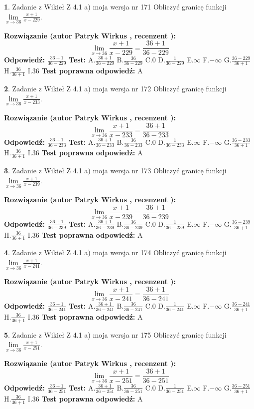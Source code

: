 \documentclass[12pt, a4paper]{article}
\theoremstyle{definition} %
\newtheorem{zad}{}
\newcommand{\zadStart}[1]{\begin{zad}#1\newline}
\newcommand{\zadStop}{\end{zad}}
\newcommand{\rozwStart}[2]{\noindent \textbf{Rozwiązanie (autor #1 , recenzent #2): }\newline}
\newcommand{\rozwStop}{\newline}
\newcommand{\odpStart}{\noindent \textbf{Odpowiedź:}\newline}
\newcommand{\odpStop}{\newline}
\newcommand{\testStart}{\noindent \textbf{Test:}\newline}
\newcommand{\testStop}{\newline}
\newcommand{\kluczStart}{\noindent \textbf{Test poprawna odpowiedź:}\newline}
\newcommand{\kluczStop}{\newline}
\begin{document}
\zadStart{Zadanie z Wikieł Z 4.1 a) moja wersja nr 171}
Obliczyć granicę funkcji $\lim\limits_{x\to36}\frac{x+1}{x-229}$.
\zadStop
\rozwStart{Patryk Wirkus}{}
$$\lim\limits_{x\to36}\frac{x+1}{x-229} = \frac{36+1}{36-229}$$
\rozwStop
\odpStart
$\frac{36+1}{36-229}$
\odpStop
\testStart
A.$\frac{36+1}{36-229}$
B.$\frac{36}{36-229}$
C.$0$
D.$\frac{1}{36-229}$
E.$\infty$
F.$-\infty$
G.$\frac{36-229}{36+1}$
H.$\frac{36}{36+1}$
I.$36$
\testStop
\kluczStart
A
\kluczStop



\zadStart{Zadanie z Wikieł Z 4.1 a) moja wersja nr 172}
Obliczyć granicę funkcji $\lim\limits_{x\to36}\frac{x+1}{x-233}$.
\zadStop
\rozwStart{Patryk Wirkus}{}
$$\lim\limits_{x\to36}\frac{x+1}{x-233} = \frac{36+1}{36-233}$$
\rozwStop
\odpStart
$\frac{36+1}{36-233}$
\odpStop
\testStart
A.$\frac{36+1}{36-233}$
B.$\frac{36}{36-233}$
C.$0$
D.$\frac{1}{36-233}$
E.$\infty$
F.$-\infty$
G.$\frac{36-233}{36+1}$
H.$\frac{36}{36+1}$
I.$36$
\testStop
\kluczStart
A
\kluczStop



\zadStart{Zadanie z Wikieł Z 4.1 a) moja wersja nr 173}
Obliczyć granicę funkcji $\lim\limits_{x\to36}\frac{x+1}{x-239}$.
\zadStop
\rozwStart{Patryk Wirkus}{}
$$\lim\limits_{x\to36}\frac{x+1}{x-239} = \frac{36+1}{36-239}$$
\rozwStop
\odpStart
$\frac{36+1}{36-239}$
\odpStop
\testStart
A.$\frac{36+1}{36-239}$
B.$\frac{36}{36-239}$
C.$0$
D.$\frac{1}{36-239}$
E.$\infty$
F.$-\infty$
G.$\frac{36-239}{36+1}$
H.$\frac{36}{36+1}$
I.$36$
\testStop
\kluczStart
A
\kluczStop



\zadStart{Zadanie z Wikieł Z 4.1 a) moja wersja nr 174}
Obliczyć granicę funkcji $\lim\limits_{x\to36}\frac{x+1}{x-241}$.
\zadStop
\rozwStart{Patryk Wirkus}{}
$$\lim\limits_{x\to36}\frac{x+1}{x-241} = \frac{36+1}{36-241}$$
\rozwStop
\odpStart
$\frac{36+1}{36-241}$
\odpStop
\testStart
A.$\frac{36+1}{36-241}$
B.$\frac{36}{36-241}$
C.$0$
D.$\frac{1}{36-241}$
E.$\infty$
F.$-\infty$
G.$\frac{36-241}{36+1}$
H.$\frac{36}{36+1}$
I.$36$
\testStop
\kluczStart
A
\kluczStop



\zadStart{Zadanie z Wikieł Z 4.1 a) moja wersja nr 175}
Obliczyć granicę funkcji $\lim\limits_{x\to36}\frac{x+1}{x-251}$.
\zadStop
\rozwStart{Patryk Wirkus}{}
$$\lim\limits_{x\to36}\frac{x+1}{x-251} = \frac{36+1}{36-251}$$
\rozwStop
\odpStart
$\frac{36+1}{36-251}$
\odpStop
\testStart
A.$\frac{36+1}{36-251}$
B.$\frac{36}{36-251}$
C.$0$
D.$\frac{1}{36-251}$
E.$\infty$
F.$-\infty$
G.$\frac{36-251}{36+1}$
H.$\frac{36}{36+1}$
I.$36$
\testStop
\kluczStart
A
\kluczStop
\end{document}
